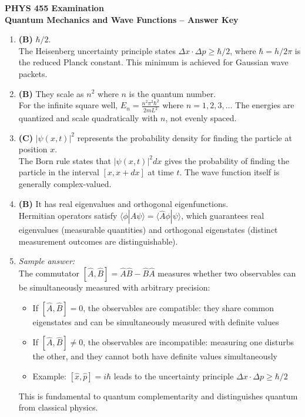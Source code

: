\documentclass[11pt]{article}
\begin{document}
\begin{center}
  {\Large \textbf{PHYS 455 Examination}}\\[0.25em]
  {\large \textbf{Quantum Mechanics and Wave Functions -- Answer Key}}\\[0.5em]
\end{center}

\begin{enumerate}[label=\textbf{\arabic*.}]

  \item \textbf{(B)} $\hbar/2$.\\
  The Heisenberg uncertainty principle states $\Delta x \cdot \Delta p \geq \hbar/2$, where 
  $\hbar = h/2\pi$ is the reduced Planck constant. This minimum is achieved for Gaussian wave packets.

  \item \textbf{(B)} They scale as $n^2$ where $n$ is the quantum number.\\
  For the infinite square well, $E_n = \frac{n^2 \pi^2 \hbar^2}{2mL^2}$ where $n = 1, 2, 3, \ldots$ 
  The energies are quantized and scale quadratically with $n$, not evenly spaced.

  \item \textbf{(C)} $|\psi(x,t)|^2$ represents the probability density for finding the particle at 
  position $x$.\\
  The Born rule states that $|\psi(x,t)|^2 dx$ gives the probability of finding the particle in the 
  interval $[x, x+dx]$ at time $t$. The wave function itself is generally complex-valued.

  \item \textbf{(B)} It has real eigenvalues and orthogonal eigenfunctions.\\
  Hermitian operators satisfy $\langle \phi | \hat{A} \psi \rangle = \langle \hat{A} \phi | \psi \rangle$, 
  which guarantees real eigenvalues (measurable quantities) and orthogonal eigenstates (distinct measurement 
  outcomes are distinguishable).

  \item \emph{Sample answer:}\\
  The commutator $[\hat{A}, \hat{B}] = \hat{A}\hat{B} - \hat{B}\hat{A}$ measures whether two observables 
  can be simultaneously measured with arbitrary precision:
  \begin{itemize}
    \item If $[\hat{A}, \hat{B}] = 0$, the observables are compatible: they share common eigenstates 
    and can be simultaneously measured with definite values
    \item If $[\hat{A}, \hat{B}] \neq 0$, the observables are incompatible: measuring one disturbs 
    the other, and they cannot both have definite values simultaneously
    \item Example: $[\hat{x}, \hat{p}] = i\hbar$ leads to the uncertainty principle 
    $\Delta x \cdot \Delta p \geq \hbar/2$
  \end{itemize}
  This is fundamental to quantum complementarity and distinguishes quantum from classical physics.


\end{enumerate}
\end{document}
